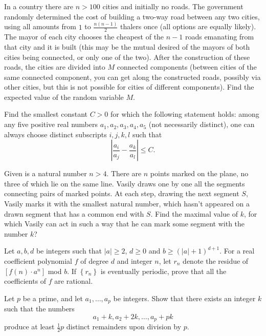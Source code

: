 \documentclass[11pt]{scrartcl}
\begin{document}
\begin{problem}[4118541811915047639]
	In a country there are $n>100$ cities and initially no roads. The government randomly determined the cost of building a two-way road between any two cities, using all amounts from $1$ to $\frac{n(n-1)}{2}$ thalers once (all options are equally likely). The mayor of each city chooses the cheapest of the $n-1$ roads emanating from that city and it is built (this may be the mutual desired of the mayors of both cities being connected, or only one of the two).
After the construction of these roads, the cities are divided into $M$ connected components (between cities of the same connected component, you can get along the constructed roads, possibly via other cities, but this is not possible for cities of different components). Find the expected value of the random variable $M$.
\end{problem}
\begin{problem}[4190798556185983491]
Find the smallest constant $C > 0$ for which the following statement holds: among any five positive real numbers $a_1,a_2,a_3,a_4,a_5$ (not necessarily distinct), one can always choose distinct subscripts $i,j,k,l$ such that
\[ \left| \frac{a_i}{a_j} - \frac {a_k}{a_l} \right| \le C. \]
\end{problem}
\begin{problem}[4218160072471349910]
Given is a natural number $n>4$. There are $n$ points marked on the plane, no three of which lie on the same line. Vasily draws one by one all the segments connecting pairs of marked points. At each step, drawing the next segment $S$, Vasily marks it with the smallest natural number, which hasn't appeared on a drawn segment that has a common end with $S$. Find the maximal value of $k$, for which Vasily can act in such a way that he can mark some segment with the number $k$?
\end{problem}
\begin{problem}[4275949150000368692]
	Let $a,b,d$ be integers such that $\left|a\right| \geqslant 2$, $d \geqslant 0$ and $b \geqslant \left( \left|a\right| + 1\right)^{d + 1}$. For a real coefficient polynomial $f$ of degree $d$ and integer $n$, let $r_n$ denote the residue of $\left[ f(n) \cdot a^n \right]$ mod $b$. If $\left \{ r_n \right \}$ is eventually periodic, prove that all the coefficients of $f$ are rational.
\end{problem}
\begin{problem}[4278278843148290847]
	Let $p$ be a prime, and let $a_1, \dots, a_p$ be integers. Show that there exists an integer $k$ such that the numbers
\[a_1 + k, a_2 + 2k, \dots, a_p + pk\]produce at least $\tfrac{1}{2} p$ distinct remainders upon division by $p$.
\end{problem}
\end{document}
